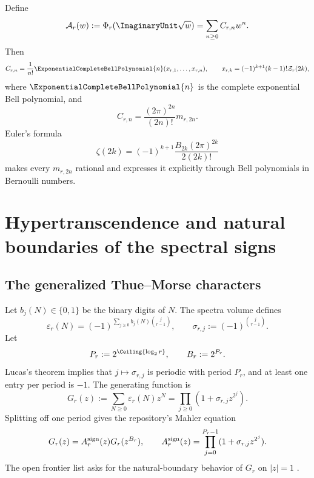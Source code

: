 \documentclass[11pt,oneside]{article}
\theoremstyle{definition}
\theoremstyle{remark}
\newcommand{\ZetaR}{\mathcal Z}
\newcommand{\Ar}{\mathcal A}
\begin{document}
Define
\begin{equation}\label{eq:A-def-early}
 \Ar_r(w):=\Phi_r(\ImaginaryUnit\sqrt w)=\sum_{n\geq0}C_{r,n}w^n.
\end{equation}
Then
\begin{equation}\label{eq:Bell-coeff}
 C_{r,n}=\frac{1}{n!}\ExponentialCompleteBellPolynomial{n}(x_{r,1},\ldots,x_{r,n}),
 \qquad
 x_{r,k}=(-1)^{k+1}(k-1)!\ZetaR_r(2k),
\end{equation}
where $\ExponentialCompleteBellPolynomial{n}$ is the complete exponential Bell polynomial, and
\begin{equation}\label{eq:C-moment}
 C_{r,n}=\frac{(2\pi)^{2n}}{(2n)!}m_{r,2n}.
\end{equation}
Euler's formula
\[
 \zeta(2k)=(-1)^{k+1}\frac{B_{2k}(2\pi)^{2k}}{2(2k)!}
\]
makes every $m_{r,2n}$ rational and expresses it explicitly through Bell
polynomials in Bernoulli numbers.

\section{Hypertranscendence and natural boundaries of the spectral signs}

\subsection{The generalized Thue--Morse characters}

Let $b_j(N)\in\{0,1\}$ be the binary digits of $N$.  The spectra volume
defines
\begin{equation}\label{eq:epsilon}
 \varepsilon_r(N)=(-1)^{\sum_{j\geq0}b_j(N)\binom j{r-1}},
 \qquad
 \sigma_{r,j}:=(-1)^{\binom j{r-1}}.
\end{equation}
Let
\begin{equation}\label{eq:Pr}
 P_r:=2^{\Ceiling{\log_2r}},\qquad B_r:=2^{P_r}.
\end{equation}
Lucas's theorem implies that $j\mapsto\sigma_{r,j}$ is periodic with period
$P_r$, and at least one entry per period is $-1$.  The generating function is
\begin{equation}\label{eq:G-product}
 G_r(z):=\sum_{N\geq0}\varepsilon_r(N)z^N
 =\prod_{j\geq0}(1+\sigma_{r,j}z^{2^j}).
\end{equation}
Splitting off one period gives the repository's Mahler equation
\begin{equation}\label{eq:G-Mahler}
 G_r(z)=A_r^{\rm sign}(z)G_r(z^{B_r}),
 \qquad
 A_r^{\rm sign}(z)=\prod_{j=0}^{P_r-1}(1+\sigma_{r,j}z^{2^j}).
\end{equation}
The open frontier list asks for the natural-boundary behavior of $G_r$ on
$|z|=1$ \cite{repo-spectra}.
\end{document}
